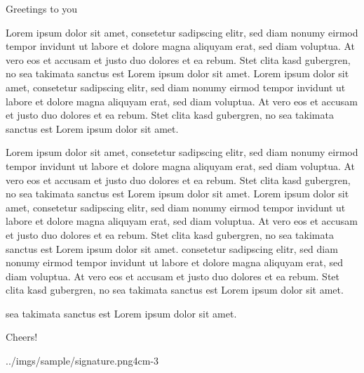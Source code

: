 \documentclass[11pt]{letterclass}
\begin{document}
	\opening{Greetings to you}
	Lorem ipsum dolor sit amet, consetetur sadipscing elitr, sed diam nonumy eirmod tempor invidunt ut labore et dolore magna aliquyam erat, sed diam voluptua. At vero eos et accusam et justo duo dolores et ea rebum. Stet clita kasd gubergren, no sea takimata sanctus est Lorem ipsum dolor sit amet. Lorem ipsum dolor sit amet, consetetur sadipscing elitr, sed diam nonumy eirmod tempor invidunt ut labore et dolore magna aliquyam erat, sed diam voluptua. At vero eos et accusam et justo duo dolores et ea rebum. Stet clita kasd gubergren, no sea takimata sanctus est Lorem ipsum dolor sit amet.
	
	Lorem ipsum dolor sit amet, consetetur sadipscing elitr, sed diam nonumy eirmod tempor invidunt ut labore et dolore magna aliquyam erat, sed diam voluptua. At vero eos et accusam et justo duo dolores et ea rebum. Stet clita kasd gubergren, no sea takimata sanctus est Lorem ipsum dolor sit amet. Lorem ipsum dolor sit amet, consetetur sadipscing elitr, sed diam nonumy eirmod tempor invidunt ut labore et dolore magna aliquyam erat, sed diam voluptua. At vero eos et accusam et justo duo dolores et ea rebum. Stet clita kasd gubergren, no sea takimata sanctus est Lorem ipsum dolor sit amet.
	consetetur sadipscing elitr, sed diam nonumy eirmod tempor invidunt ut labore et dolore magna aliquyam erat, sed diam voluptua. At vero eos et accusam et justo duo dolores et ea rebum. Stet clita kasd gubergren, no sea takimata sanctus est Lorem ipsum dolor sit amet.
	
	sea takimata sanctus est Lorem ipsum dolor sit amet.	
	\closing{Cheers!}
	\signature{Boris Spider}{../imgs/sample/signature.png}{4cm}{-3\baselineskip} %
\end{document}
